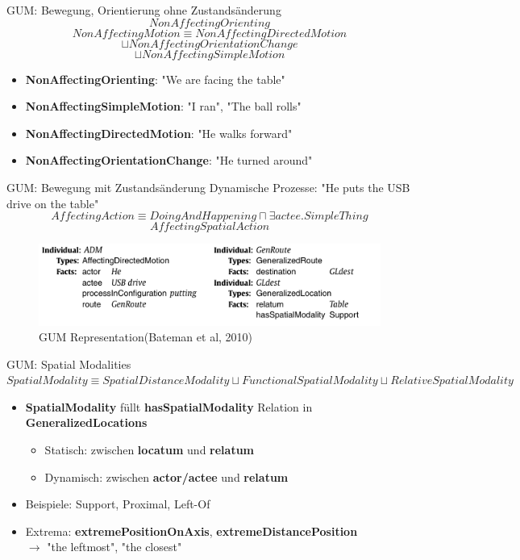 \documentclass[12pt,a4paper]{beamer}
\begin{document}
\begin{frame}{GUM: Bewegung, Orientierung ohne Zustandsänderung}
$$ NonAffectingOrienting  $$
$$ NonAffectingMotion \equiv NonAffectingDirectedMotion$$ 
$$\sqcup NonAffectingOrientationChange $$
$$\sqcup NonAffectingSimpleMotion$$
\begin{itemize}
\item \textbf{NonAffectingOrienting}: "We are facing the table"
\item \textbf{NonAffectingSimpleMotion}:  "I ran", "The ball rolls"
\item \textbf{NonAffectingDirectedMotion}: "He walks forward"
\item \textbf{NonAffectingOrientationChange}: "He turned around"
\end{itemize}
\end{frame}


\begin{frame}{GUM: Bewegung mit Zustandsänderung}
Dynamische Prozesse: "He puts the USB drive on the table"
$$AffectingAction \equiv DoingAndHappening \sqcap \exists actee.SimpleThing$$
$$AffectingSpatialAction$$
\begin{figure}
\includegraphics[scale=0.7]{img/2010_puts_usb_on_table.png}
\caption{GUM Representation(Bateman et al, 2010)}
\end{figure}
\end{frame}

\begin{frame}{GUM: Spatial Modalities}
$  SpatialModality \equiv SpatialDistanceModality \sqcup FunctionalSpatialModality \sqcup RelativeSpatialModality $
\begin{itemize}
\item \textbf{SpatialModality} füllt \textbf{hasSpatialModality} Relation in \textbf{GeneralizedLocations}
\begin{itemize}
    \item Statisch: zwischen \textbf{locatum} und \textbf{relatum}
    \item Dynamisch: zwischen \textbf{actor/actee} und \textbf{relatum}
\end{itemize}
\item Beispiele: Support, Proximal, Left-Of
\item Extrema: \textbf{extremePositionOnAxis}, \textbf{extremeDistancePosition} \\
$\to$ "the leftmost", "the closest"
\end{itemize}
\end{frame}
\end{document}

